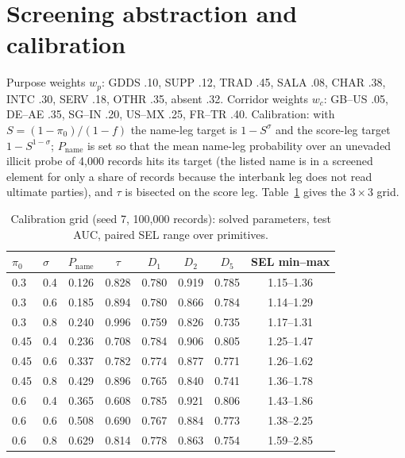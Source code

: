 \documentclass[conference]{IEEEtran}
\begin{document}
\section{Screening abstraction and calibration}
Purpose weights $w_p$: GDDS .10, SUPP .12, TRAD .45, SALA .08, CHAR .38, INTC
.30, SERV .18, OTHR .35, absent .32. Corridor weights $w_c$: GB--US .05, DE--AE
.35, SG--IN .20, US--MX .25, FR--TR .40. Calibration: with
$S=(1-\pi_0)/(1-f)$ the name-leg target is $1-S^{\sigma}$ and the score-leg
target $1-S^{1-\sigma}$; $P_{\mathrm{name}}$ is set so that the mean name-leg
probability over an unevaded illicit probe of 4,000 records hits its target
(the listed name is in a screened element for only a share of records because
the interbank leg does not read ultimate parties), and $\tau$ is bisected on
the score leg. Table~\ref{tab:grid} gives the $3\times3$ grid.
\begin{table}[t]\caption{Calibration grid (seed 7, 100,000 records): solved parameters, test AUC, paired SEL range over primitives.}\label{tab:grid}\centering\scriptsize
\begin{tabular}{@{}llcccccc@{}}\toprule
$\pi_0$ & $\sigma$ & $P_{\mathrm{name}}$ & $\tau$ & $D_1$ & $D_2$ & $D_5$ & SEL min--max \\\midrule
0.3 & 0.4 & 0.126 & 0.828 & 0.780 & 0.919 & 0.785 & 1.15--1.36 \\
0.3 & 0.6 & 0.185 & 0.894 & 0.780 & 0.866 & 0.784 & 1.14--1.29 \\
0.3 & 0.8 & 0.240 & 0.996 & 0.759 & 0.826 & 0.735 & 1.17--1.31 \\
0.45 & 0.4 & 0.236 & 0.708 & 0.784 & 0.906 & 0.805 & 1.25--1.47 \\
0.45 & 0.6 & 0.337 & 0.782 & 0.774 & 0.877 & 0.771 & 1.26--1.62 \\
0.45 & 0.8 & 0.429 & 0.896 & 0.765 & 0.840 & 0.741 & 1.36--1.78 \\
0.6 & 0.4 & 0.365 & 0.608 & 0.785 & 0.921 & 0.806 & 1.43--1.86 \\
0.6 & 0.6 & 0.508 & 0.690 & 0.767 & 0.884 & 0.773 & 1.38--2.25 \\
0.6 & 0.8 & 0.629 & 0.814 & 0.778 & 0.863 & 0.754 & 1.59--2.85 \\
\bottomrule\end{tabular}\end{table}
\end{document}

